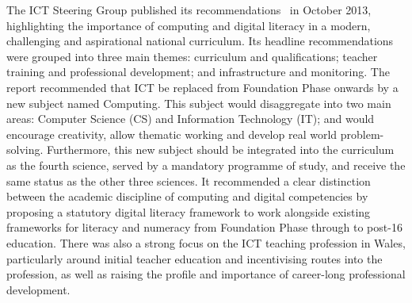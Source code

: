 \documentclass[conference]{IEEEtran}
\begin{document}



The ICT Steering Group published its
recommendations~\cite{welshictreview:2013} in October 2013,
highlighting the importance of computing and digital literacy in a
modern, challenging and aspirational national curriculum. Its headline
recommendations were grouped into three main themes: curriculum and
qualifications; teacher training and professional development; and
infrastructure and monitoring. The report recommended that ICT be
replaced from Foundation Phase onwards by a new subject named
Computing.  This subject would disaggregate into two main areas:
Computer Science (CS) and Information Technology (IT); and would
encourage creativity, allow thematic working and develop real world
problem-solving.  Furthermore, this new subject should be integrated
into the curriculum as the fourth science, served by a mandatory
programme of study, and receive the same status as the other three
sciences. It recommended a clear distinction between the academic
discipline of computing and digital competencies by proposing a
statutory digital literacy framework to work alongside existing
frameworks for literacy and numeracy from Foundation Phase through to
post-16 education. There was also a strong focus on the ICT teaching
profession in Wales, particularly around initial teacher education and
incentivising routes into the profession, as well as raising the
profile and importance of career-long professional development.
\end{document}

